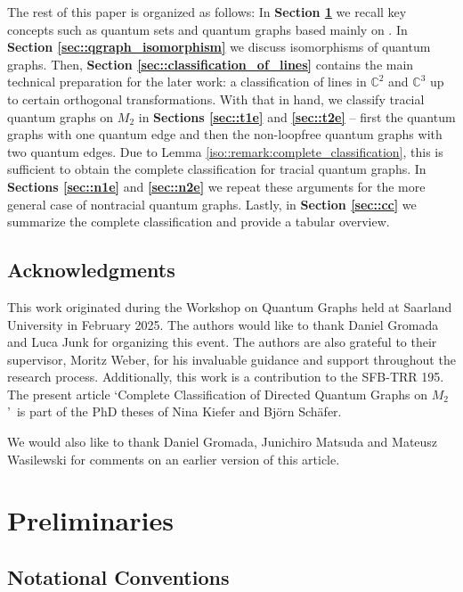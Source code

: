 \documentclass{amsart}
\newcommand{\C}{\mathbb{C}}
\begin{document}
The rest of this paper is organized as follows: In \textbf{Section \ref{sec::preliminaries}} we recall key concepts such as quantum sets and quantum graphs based mainly on \cite{wasilewski_quantum_2024}. In \textbf{Section \ref{sec::qgraph_isomorphism}} we discuss isomorphisms of quantum graphs. Then, \textbf{Section \ref{sec::classification_of_lines}} contains the main technical preparation for the later work: a classification of lines in $\C^2$ and $\C^3$ up to certain orthogonal transformations. With that in hand, we classify tracial quantum graphs on $M_2$ in \textbf{Sections \ref{sec::t1e}} and \textbf{\ref{sec::t2e}} -- first the quantum graphs with one quantum edge and then the non-loopfree quantum graphs with two quantum edges. Due to Lemma \ref{iso::remark:complete_classification}, this is sufficient to obtain the complete classification for tracial quantum graphs. In \textbf{Sections \ref{sec::n1e}} and \textbf{\ref{sec::n2e}} we repeat these arguments for the more general case of nontracial quantum graphs. Lastly, in \textbf{Section \ref{sec::cc}} we summarize the complete classification and provide a tabular overview.

\subsection{Acknowledgments}

This work originated during the Workshop on Quantum Graphs held at Saarland University in February 2025. The authors would like to thank Daniel Gromada and Luca Junk for organizing this event. The authors are also grateful to their supervisor, Moritz Weber, for his invaluable guidance and support throughout the research process.
Additionally, this work is a contribution to the SFB-TRR 195.
The present article \lq Complete Classification of Directed Quantum Graphs on $M_2$\rq\ is part of the PhD theses of Nina Kiefer and Björn Schäfer.

We would also like to thank Daniel Gromada, Junichiro Matsuda and Mateusz Wasilewski for comments on an earlier version of this article.


\section{Preliminaries}
\label{sec::preliminaries}

\subsection{Notational Conventions}
\end{document}
